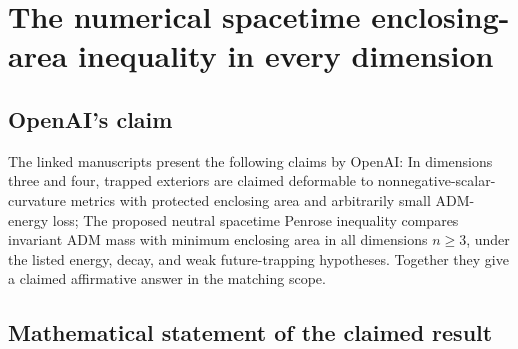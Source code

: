 \documentclass[11pt]{article}
\begin{document}
\section*{The numerical spacetime enclosing-area inequality in every dimension}

\subsection{OpenAI's claim}
The linked manuscripts present the following claims by OpenAI: In dimensions three and four, trapped exteriors are claimed deformable to nonnegative-scalar-curvature metrics with protected enclosing area and arbitrarily small ADM-energy loss; The proposed neutral spacetime Penrose inequality compares invariant ADM mass with minimum enclosing area in all dimensions $n\geq3$, under the listed energy, decay, and weak future-trapping hypotheses. Together they give a claimed affirmative answer in the matching scope.

\subsection{Mathematical statement of the claimed result}
\end{document}
